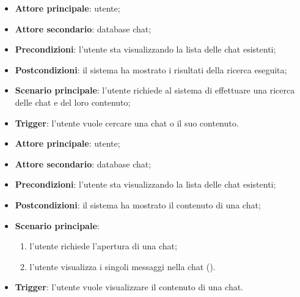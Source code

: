 \documentclass[10pt, a4paper]{article}
\begin{document}
    \begin{itemize}
        \item \textbf{Attore principale}: utente;
        \item \textbf{Attore secondario}: database chat;
        \item \textbf{Precondizioni}: l’utente sta visualizzando la lista delle chat esistenti;
        \item \textbf{Postcondizioni}: il sistema ha mostrato i risultati della ricerca eseguita;
        \item \textbf{Scenario principale}: l’utente richiede al sistema di effettuare una ricerca delle chat e del loro contenuto;
        \item \textbf{Trigger}: l’utente vuole cercare una chat o il suo contenuto.
    \end{itemize}

    \begin{itemize}
        \item \textbf{Attore principale}: utente;
        \item \textbf{Attore secondario}: database chat;
        \item \textbf{Precondizioni}: l’utente sta visualizzando la lista delle chat esistenti;
        \item \textbf{Postcondizioni}: il sistema ha mostrato il contenuto di una chat;
        \item \textbf{Scenario principale}:
            \begin{enumerate}
                \item l’utente richiede l’apertura di una chat;
                \item l'utente visualizza i singoli messaggi nella chat ().
            \end{enumerate}
        \item \textbf{Trigger}: l’utente vuole visualizzare il contenuto di una chat.
    \end{itemize}
\end{document}
